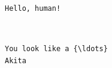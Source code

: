 \documentclass[11pt]{article}
\begin{document}
    \begin{Verbatim}[commandchars=\\\{\}]
Hello, human!

    \end{Verbatim}

    \begin{center}
    \end{center}
    { \hspace*{\fill} \\}
    
    \begin{Verbatim}[commandchars=\\\{\}]
You look like a {\ldots}
Akita

    \end{Verbatim}


    
    
    
    
\end{document}
